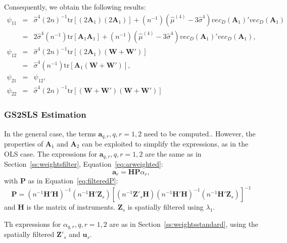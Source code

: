 \documentclass{article}
\begin{document}
Consequently, we obtain the following results:
\begin{eqnarray*}
 \psi_{11} &=& \hat{\sigma}^4 (2n)^{-1} \mbox{tr} [ (2 \mathbf{A}_1 ) (2 \mathbf{A}_1 ) ]
               + (n^{-1}) (\hat{\mu}^{(4)} - 3 \hat{\sigma}^4) vec_D(\mathbf{A}_1)'vec_D (\mathbf{A}_1) \\
        &=&  2  \hat{\sigma}^4 (n^{-1}) \mbox{tr} [ \mathbf{A}_1\mathbf{A}_1 ]
       + (n^{-1}) (\hat{\mu}^{(4)} - 3 \hat{\sigma}^4) vec_D(\mathbf{A}_1)'vec_D (\mathbf{A}_1) ,\\
  \psi_{12} &=& \hat{\sigma}^4 (2n)^{-1} \mbox{tr} [ (2 \mathbf{A}_1 ) (\mathbf{W} + \mathbf{W'} ) ]\\
       &=& \hat{\sigma}^4 (n^{-1}) \mbox{tr} [  \mathbf{A}_1 (\mathbf{W} + \mathbf{W'} )  ],\\
   \psi_{21} &=& \psi_{12},\\
   \psi_{22} &=& \hat{\sigma}^4 (2n)^{-1} \mbox{tr} [ (\mathbf{W} + \mathbf{W'}) 
   (\mathbf{W} + \mathbf{W'}) ]
\end{eqnarray*}

\subsubsection{GS2SLS Estimation}
In the general case, the terms $\mathbf{a}_{q,r}, q, r = 1, 2$ need to be computed..
However, the properties of $\mathbf{A}_1$ and $\mathbf{A}_2$ can be exploited to
simplify the expressions, as in the OLS case.
The expressions for $\mathbf{a}_{q,r}, q, r = 1, 2$ are the same as in Section~\ref{ss:weightsfilter},
Equation~\ref{eq:arweighted}:
\begin{equation*}
\mathbf{a}_r = \mathbf{HP} \alpha_r,
\end{equation*}
with $\mathbf{P}$
as in Equation~\ref{eq:filteredP}:
\begin{equation*}
\mathbf{P} = (n^{-1}\mathbf{H'H})^{-1} ( n^{-1} \mathbf{H'Z}_s ) 
        [ (n^{-1} \mathbf{Z'}_s \mathbf{H} ) (n^{-1} \mathbf{H'H} )^{-1} (n^{-1} \mathbf{H'Z}_s) ]^{-1}
\end{equation*}
and $\mathbf{H}$ is the matrix of instruments. $\mathbf{Z}_s$ is spatially filtered using $\lambda_1$.

Th expressions for $\alpha_{q,r}, q, r = 1,2$ are as in Section~\ref{ss:weightsstandard},
using the spatially filtered $\mathbf{Z'}_s$ and $\mathbf{u}_s$. 
\end{document}
